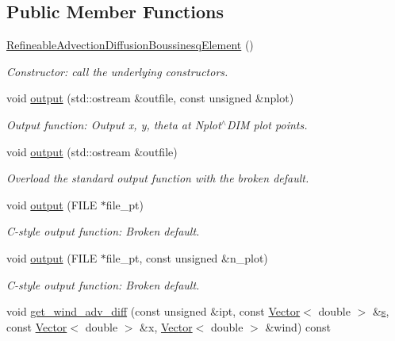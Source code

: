 \subsection*{Public Member Functions}
\begin{DoxyCompactItemize}
\item 
\hyperlink{classoomph_1_1RefineableAdvectionDiffusionBoussinesqElement_a26f91df92dc910d525ec920b9d674046}{Refineable\+Advection\+Diffusion\+Boussinesq\+Element} ()
\begin{DoxyCompactList}\small\item\em Constructor\+: call the underlying constructors. \end{DoxyCompactList}\item 
void \hyperlink{classoomph_1_1RefineableAdvectionDiffusionBoussinesqElement_a91bd582775205de08b7c0092acc82a0d}{output} (std\+::ostream \&outfile, const unsigned \&nplot)
\begin{DoxyCompactList}\small\item\em Output function\+: Output x, y, theta at Nplot$^\wedge$\+D\+IM plot points. \end{DoxyCompactList}\item 
void \hyperlink{classoomph_1_1RefineableAdvectionDiffusionBoussinesqElement_ae56c984aaa1aeddf1f458e700ffbe6a1}{output} (std\+::ostream \&outfile)
\begin{DoxyCompactList}\small\item\em Overload the standard output function with the broken default. \end{DoxyCompactList}\item 
void \hyperlink{classoomph_1_1RefineableAdvectionDiffusionBoussinesqElement_ac8fa2a491b9c5bda7bcfdd93d0a00b11}{output} (F\+I\+LE $\ast$file\+\_\+pt)
\begin{DoxyCompactList}\small\item\em C-\/style output function\+: Broken default. \end{DoxyCompactList}\item 
void \hyperlink{classoomph_1_1RefineableAdvectionDiffusionBoussinesqElement_a61bcd2e4a50f8e157ca40572b384dcee}{output} (F\+I\+LE $\ast$file\+\_\+pt, const unsigned \&n\+\_\+plot)
\begin{DoxyCompactList}\small\item\em C-\/style output function\+: Broken default. \end{DoxyCompactList}\item 
void \hyperlink{classoomph_1_1RefineableAdvectionDiffusionBoussinesqElement_a8279f67a0b2150be8f80d51c647f5e9e}{get\+\_\+wind\+\_\+adv\+\_\+diff} (const unsigned \&ipt, const \hyperlink{classoomph_1_1Vector}{Vector}$<$ double $>$ \&\hyperlink{cfortran_8h_ab7123126e4885ef647dd9c6e3807a21c}{s}, const \hyperlink{classoomph_1_1Vector}{Vector}$<$ double $>$ \&x, \hyperlink{classoomph_1_1Vector}{Vector}$<$ double $>$ \&wind) const

\end{DoxyCompactItemize}
